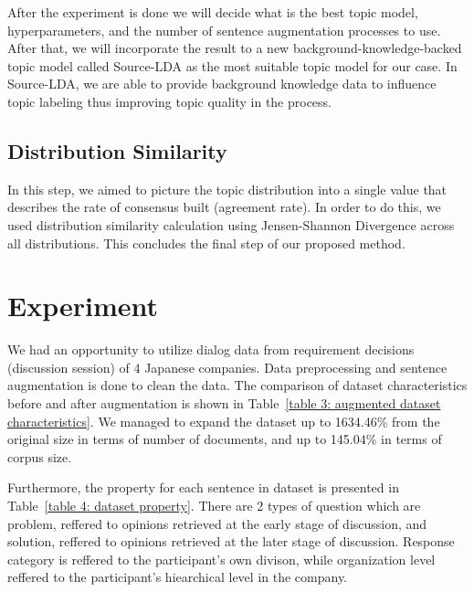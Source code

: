 \documentclass[10pt, conference, compsocconf]{IEEEtran}
\begin{document}
After the experiment is done we will decide what is the best topic model, hyperparameters, and the number of sentence augmentation processes to use. After that, we will incorporate the result to a new background-knowledge-backed topic model called Source-LDA\cite{b9} as the most suitable topic model for our case. In Source-LDA, we are able to provide background knowledge data to influence topic labeling thus improving topic quality in the process.

\subsection{Distribution Similarity}
In this step, we aimed to picture the topic distribution into a single value that describes the rate of consensus built (agreement rate). In order to do this, we used distribution similarity calculation using Jensen-Shannon Divergence across all distributions\cite{b10}. This concludes the final step of our proposed method.

\section{Experiment}
\label{sec_exp}
We had an opportunity to utilize dialog data from requirement decisions (discussion session) of 4 Japanese companies. Data preprocessing and sentence augmentation is done to clean the data. The comparison of dataset characteristics before and after augmentation is shown in Table~\ref{table 3: augmented dataset characteristics}. We managed to expand the dataset up to 1634.46\% from the original size in terms of number of documents, and up to 145.04\% in terms of corpus size. 

Furthermore, the property for each sentence in dataset is presented in Table~\ref{table 4: dataset property}. There are 2 types of question which are problem, reffered to opinions retrieved at the early stage of discussion, and solution, reffered to opinions retrieved at the later stage of discussion. Response category is reffered to the participant's own divison, while organization level reffered to the participant's hiearchical level in the company.
\end{document}
